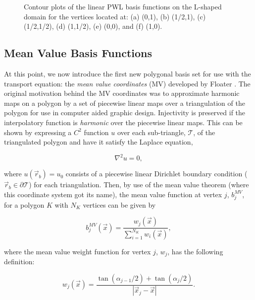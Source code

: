 \begin{figure}
\begin{subfigure}[b]{0.39\textwidth}
		\caption{}
	\end{subfigure}
\caption{Contour plots of the linear PWL basis functions on the L-shaped domain for the vertices located at: (a) (0,1), (b) (1/2,1), (c) (1/2,1/2), (d) (1,1/2), (e) (0,0), and (f) (1,0).}
\label{fig::2D_PWLD1_Ldom_basis_functions}
\end{figure}





\subsection{Mean Value Basis Functions}
\label{sec::BF_2DLinear_MV}

At this point, we now introduce the first new polygonal basis set for use with the transport equation: the {\em mean value coordinates} (MV) developed by Floater \cite{floater2003mean}. The original motivation behind the MV coordinates was to approximate harmonic maps on a polygon by a set of piecewise linear maps over a triangulation of the polygon for use in computer aided graphic design. Injectivity is preserved if the interpolatory function is {\em harmonic} over the piecewise linear maps. This can be shown by expressing a $C^2$ function $u$ over each sub-triangle, $\mathcal{T}$, of the triangulated polygon and have it satisfy the Laplace equation,

\begin{equation}
\label{eq::BF_MV_laplace}
\nabla^2 u = 0 ,
\end{equation}

\noindent where $u(\vec{r}_b) = u_0$ consists of a piecewise linear Dirichlet boundary condition ($\vec{r}_b \in \partial \mathcal{T}$) for each triangulation. Then, by use of the mean value theorem (where this coordinate system got its name), the mean value function at vertex $j$, $b_{j}^{MV}$, for a polygon $K$ with $N_K$ vertices can be given by

\begin{equation}
\label{eq::BF_MV_BF}
b_{j}^{MV} (\vec{x}) = \frac{w_j (\vec{x}) }{\sum\limits_{i=1}^{N_K} w_i (\vec{x})} ,
\end{equation}

\noindent where the mean value weight function for vertex $j$, $w_j$, has the following definition:

\begin{equation}
\label{eq::BF_MV_weights}
w_j (\vec{x})  = \frac{\tan(\alpha_{j-1} / 2) + \tan(\alpha_j / 2)}{|\vec{x}_j - \vec{x}|}.
\end{equation}


